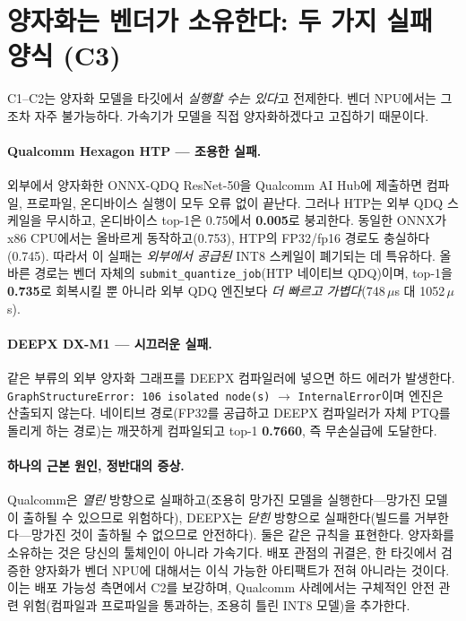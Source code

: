 \documentclass[11pt]{article}
\begin{document}
\section{양자화는 벤더가 소유한다: 두 가지 실패 양식 (C3)}

C1--C2는 양자화 모델을 타깃에서 \emph{실행할 수는 있다}고 전제한다. 벤더 NPU에서는 그조차 자주 불가능하다. 가속기가 모델을 직접 양자화하겠다고 고집하기 때문이다.

\paragraph{Qualcomm Hexagon HTP --- 조용한 실패.}
외부에서 양자화한 ONNX-QDQ ResNet-50을 Qualcomm AI Hub에 제출하면 컴파일, 프로파일, 온디바이스 실행이 모두 오류 없이 끝난다. 그러나 HTP는 외부 QDQ 스케일을 무시하고, 온디바이스 top-1은 0.75에서 \textbf{0.005}로 붕괴한다. 동일한 ONNX가 x86 CPU에서는 올바르게 동작하고(0.753), HTP의 FP32/fp16 경로도 충실하다(0.745). 따라서 이 실패는 \emph{외부에서 공급된} INT8 스케일이 폐기되는 데 특유하다. 올바른 경로는 벤더 자체의 \texttt{submit\_quantize\_job}(HTP 네이티브 QDQ)이며, top-1을 \textbf{0.735}로 회복시킬 뿐 아니라 외부 QDQ 엔진보다 \emph{더 빠르고 가볍다}(748\,$\mu$s 대 1052\,$\mu$s).

\paragraph{DEEPX DX-M1 --- 시끄러운 실패.}
같은 부류의 외부 양자화 그래프를 DEEPX 컴파일러에 넣으면 하드 에러가 발생한다. \texttt{GraphStructureError: 106 isolated node(s)} $\rightarrow$ \texttt{InternalError}이며 엔진은 산출되지 않는다. 네이티브 경로(FP32를 공급하고 DEEPX 컴파일러가 자체 PTQ를 돌리게 하는 경로)는 깨끗하게 컴파일되고 top-1 \textbf{0.7660}, 즉 무손실급에 도달한다.

\paragraph{하나의 근본 원인, 정반대의 증상.}
Qualcomm은 \emph{열린} 방향으로 실패하고(조용히 망가진 모델을 실행한다---망가진 모델이 출하될 수 있으므로 위험하다), DEEPX는 \emph{닫힌} 방향으로 실패한다(빌드를 거부한다---망가진 것이 출하될 수 없으므로 안전하다). 둘은 같은 규칙을 표현한다. 양자화를 소유하는 것은 당신의 툴체인이 아니라 가속기다. 배포 관점의 귀결은, 한 타깃에서 검증한 양자화가 벤더 NPU에 대해서는 이식 가능한 아티팩트가 전혀 아니라는 것이다. 이는 배포 가능성 측면에서 C2를 보강하며, Qualcomm 사례에서는 구체적인 안전 관련 위험(컴파일과 프로파일을 통과하는, 조용히 틀린 INT8 모델)을 추가한다.
\end{document}
